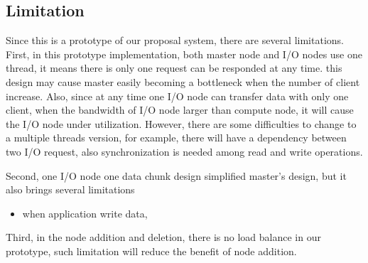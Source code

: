 \subsection{Limitation}
Since this is a prototype of our proposal system, there are several limitations.
First, in this prototype implementation, both master node and I/O nodes use one thread, it means
there is only one request can be responded at any time.
this design may cause master easily becoming a bottleneck when the number of client increase.
Also, since at any time one I/O node can transfer data with only one client, when the bandwidth of
I/O node larger than compute node, it will cause the I/O node under utilization.
However, there are some difficulties to change to a multiple threads version, for example, there
will have a dependency between two I/O request, also synchronization is needed among read and write
operations.

Second, one I/O node one data chunk design simplified master's design, but it also brings several
limitations
\begin{itemize}
  \item when application write data, 
\end{itemize}

Third, in the node addition and deletion, there is no load balance in our prototype, such limitation
will reduce the benefit of node addition.

